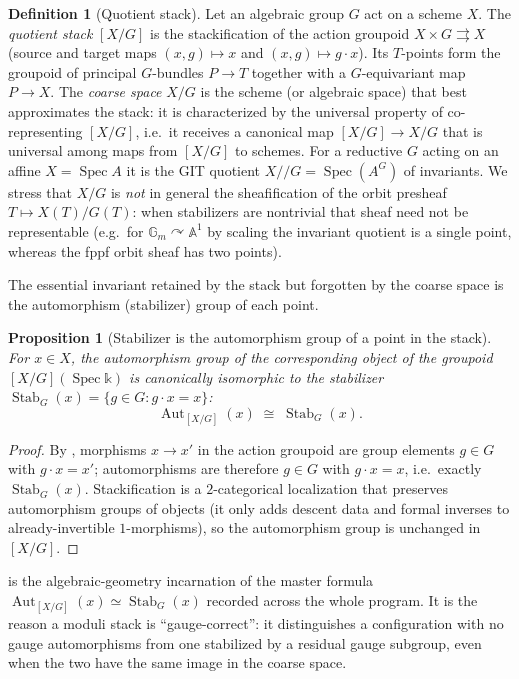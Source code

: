 \documentclass[12pt]{article}
\newtheorem{proposition}[theorem]{Proposition}
\theoremstyle{definition}
\newtheorem{definition}[theorem]{Definition}
\theoremstyle{remark}
\newcommand{\Spec}{\operatorname{Spec}}
\newcommand{\Stab}{\operatorname{Stab}}
\newcommand{\Aut}{\operatorname{Aut}}
\newcommand{\AAf}{\mathbb{A}}
\newcommand{\coeff}{\mathbb{k}}
\begin{document}
\begin{definition}[Quotient stack]
\label{def:quotstack}
Let an algebraic group $G$ act on a scheme $X$. The \emph{quotient stack} $[X/G]$ is the stackification
of the action groupoid $X\times G \rightrightarrows X$ (source and target maps $(x,g)\mapsto x$ and
$(x,g)\mapsto g\cdot x$). Its $T$-points form the groupoid of principal $G$-bundles $P\to T$ together
with a $G$-equivariant map $P\to X$. The \emph{coarse space} $X/G$ is the scheme (or algebraic space)
that best approximates the stack: it is characterized by the universal property of co-representing
$[X/G]$, i.e.\ it receives a canonical map $[X/G]\to X/G$ that is universal among maps from $[X/G]$ to
schemes. For a reductive $G$ acting on an affine $X=\Spec A$ it is the GIT quotient
$X/\!/G = \Spec(A^G)$ of invariants. We stress that $X/G$ is \emph{not} in general the sheafification of
the orbit presheaf $T\mapsto X(T)/G(T)$: when stabilizers are nontrivial that sheaf need not be
representable (e.g.\ for $\mathbb G_m\curvearrowright\AAf^1$ by scaling the invariant quotient is a single
point, whereas the fppf orbit sheaf has two points).
\end{definition}

The essential invariant retained by the stack but forgotten by the coarse space is the automorphism
(stabilizer) group of each point.

\begin{proposition}[Stabilizer is the automorphism group of a point in the stack]
\label{prop:stab}
For $x\in X$, the automorphism group of the corresponding object of the groupoid $[X/G](\Spec\coeff)$
is canonically isomorphic to the stabilizer $\Stab_G(x) = \{ g\in G : g\cdot x = x\}$:
\[
  \Aut_{[X/G]}(x) \;\cong\; \Stab_G(x).
\]
\end{proposition}
\begin{proof}
By , morphisms $x\to x'$ in the action groupoid are group elements $g\in G$ with
$g\cdot x = x'$; automorphisms are therefore $g\in G$ with $g\cdot x = x$, i.e.\ exactly $\Stab_G(x)$.
Stackification is a $2$-categorical localization that preserves automorphism groups of objects
(it only adds descent data and formal inverses to already-invertible $1$-morphisms), so the
automorphism group is unchanged in $[X/G]$.
\end{proof}

 is the algebraic-geometry incarnation of the master formula
$\Aut_{[X/G]}(x)\simeq\Stab_G(x)$ recorded across the whole program. It is the reason a moduli stack is
``gauge-correct'': it distinguishes a configuration with no gauge automorphisms from one stabilized by a
residual gauge subgroup, even when the two have the same image in the coarse space.
\end{document}
